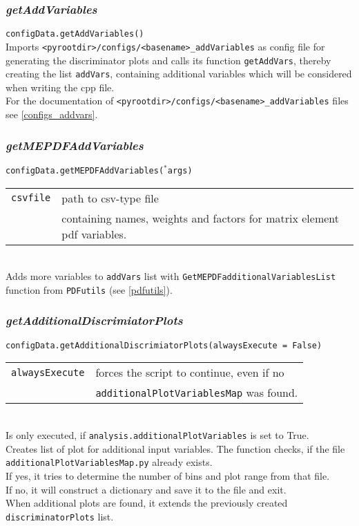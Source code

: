 \documentclass[12pt, a4paper]{article}
\newcommand{\args}{$^*$args}
\begin{document}
\subsubsection{\textit{getAddVariables}}
\texttt{configData.getAddVariables()}\\
Imports \texttt{<pyrootdir>/configs/<basename>\_addVariables} as config file for generating the discriminator plots and calls its function \texttt{getAddVars}, thereby creating the list \texttt{addVars}, containing additional variables which will be considered when writing the cpp file.\\
For the documentation of \texttt{<pyrootdir>/configs/<basename>\_addVariables} files see \ref{configs_addvars}.


\subsubsection{\textit{getMEPDFAddVariables}}
\texttt{configData.getMEPDFAddVariables(\args)}\\
\begin{tabular}{r|l}
\hline
\texttt{csvfile}	& path to csv-type file\\
					& containing names, weights and factors for matrix element pdf variables.\\
\hline
\end{tabular}
\\
Adds more variables to \texttt{addVars} list with \texttt{GetMEPDFadditionalVariablesList} function from \texttt{PDFutils} (see \ref{pdfutils}).


\subsubsection{\textit{getAdditionalDiscrimiatorPlots}}
\texttt{configData.getAdditionalDiscrimiatorPlots(alwaysExecute = False)}\\
\begin{tabular}{r|l}
\hline
\texttt{alwaysExecute}	&	forces the script to continue, even if no \\														&	\texttt{additionalPlotVariablesMap} was found.\\
\hline
\end{tabular}
\\
Is only executed, if \texttt{analysis.additionalPlotVariables} is set to True.\\
Creates list of plot for additional input variables. The function checks, if the file \texttt{additionalPlotVariablesMap.py} already exists.\\
If yes, it tries to determine the number of bins and plot range from that file. \\
If no, it will construct a dictionary and save it to the file and exit.\\
When additional plots are found, it extends the previously created \texttt{discriminatorPlots} list.
\end{document}
